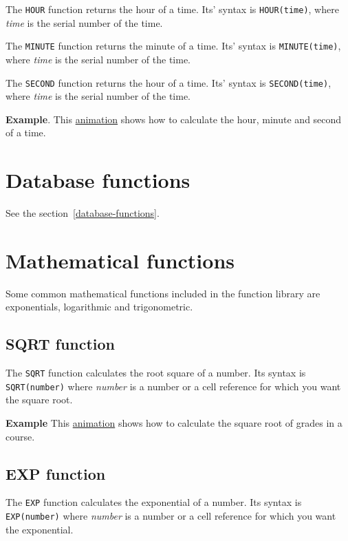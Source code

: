 The \texttt{HOUR} function returns the hour of a time. Its' syntax is \texttt{HOUR(time)}, where \emph{time} is the serial number of the time.

The \texttt{MINUTE} function returns the minute of a time. Its' syntax is \texttt{MINUTE(time)}, where \emph{time} is the serial number of the time.

The \texttt{SECOND} function returns the hour of a time. Its' syntax is \texttt{SECOND(time)}, where \emph{time} is the serial number of the time.

\textbf{Example}. This \href{http://aprendeconalf.es/office/excel/manual/img/example_function_hour.gif}{animation} shows how to calculate the hour, minute and second of a time.

\section{Database functions}

See the section~\ref{database-functions}.

\section{Mathematical functions}\hypertarget{mathematical-functions}{}\label{mathematical-functions}

Some common mathematical functions included in the function library are exponentials, logarithmic and trigonometric.

\subsection{SQRT function}\hypertarget{sqrt-function}{}\label{sqrt-function}

The \texttt{SQRT} function calculates the root square of a number. Its syntax is \texttt{SQRT(number)} where \emph{number} is a number or a cell reference for which you want the square root.

\textbf{Example} This \href{http://aprendeconalf.es/office/excel/manual/img/example_function_sqrt.gif}{animation} shows how to calculate the square root of grades in a course.

\subsection{EXP function}\hypertarget{exp-function}{}\label{exp-function}

The \texttt{EXP} function calculates the exponential of a number. Its syntax is \texttt{EXP(number)} where \emph{number} is a number or a cell reference for which you want the exponential.

